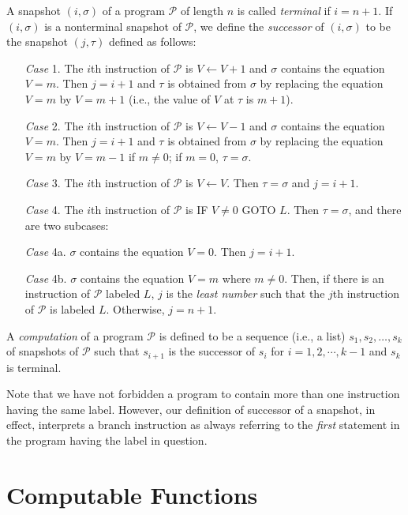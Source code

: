 \documentclass[a4paper,10pt,twoside]{book}
\begin{document}
A snapshot $(i,\sigma)$ of a program $\mathscr{P}$ of length $n$ is called \textit{terminal} if $i=n+1$. If $(i,\sigma)$ is a nonterminal snapshot of $\mathscr{P}$, we define the \textit{successor} of $(i,\sigma)$ to be the snapshot $(j,\tau)$ defined as follows:
\begin{itemize}
    \item[\textit{Case} 1.] The $i$th instruction of $\mathscr{P}$ is $V\leftarrow V+1$ and $\sigma$ contains the equation $V=m$. Then $j=i+1$ and $\tau$ is obtained from $\sigma$ by replacing the equation $V=m$ by $V=m+1$ (i.e., the value of $V$ at $\tau$ is $m+1$).
    \item[\textit{Case} 2.] The $i$th instruction of $\mathscr{P}$ is $V\leftarrow V-1$ and $\sigma$ contains the equation $V=m$. Then $j=i+1$ and $\tau$ is obtained from $\sigma$ by replacing the equation $V=m$ by $V=m-1$ if $m\neq 0$; if $m=0$, $\tau=\sigma$.
    \item[\textit{Case} 3.] The $i$th instruction of $\mathscr{P}$ is $V\leftarrow V$. Then $\tau=\sigma$ and $j=i+1$.
    \item[\textit{Case} 4.] The $i$th instruction of $\mathscr{P}$ is IF $V\neq 0$ GOTO $L$. Then $\tau=\sigma$, and there are two subcases:
    \item[\textit{Case} 4a.] $\sigma$ contains the equation $V=0$. Then $j=i+1$.
    \item[\textit{Case} 4b.] $\sigma$ contains the equation $V=m$ where $m\neq 0$. Then, if there is an instruction of $\mathscr{P}$ labeled $L$, $j$ is the \textit{least number} such that the $j$th instruction of $\mathscr{P}$ is labeled $L$. Otherwise, $j=n+1$.
\end{itemize}

A \textit{computation} of a program $\mathscr{P}$ is defined to be a sequence (i.e., a list) $s_1,s_2,\ldots,s_k$ of snapshots of $\mathscr{P}$ such that $s_{i+1}$ is the successor of $s_i$ for $i=1,2,\cdots,k-1$ and $s_k$ is terminal.

Note that we have not forbidden a program to contain more than one instruction having the same label. However, our definition of successor of a snapshot, in effect, interprets a branch instruction as always referring to the \textit{first} statement in the program having the label in question.

\section{Computable Functions}
\end{document}
